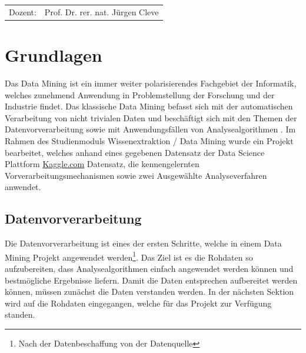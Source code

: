\documentclass[12pt,					%
							 oneside,			%
							 a4paper,			%
							 halfparskip,		%
							 liststotoc,			%
							 bibtotoc,			%
							 fleqn,				%
							 pointlessnumbers]	%
							 {scrreprt}
\newcommand{\Betreuer}{Prof. Dr. rer. nat. Jürgen Cleve}
\newcommand{\blankpage}{
	\newpage
}
\begin{document}
\begin{titlepage}
\begin{center}
\begin{table}[b]
\begin{tabular}{rl}
					Dozent: & \Betreuer \\

				\end{tabular}
			\end{table}
		\end{center}
	\end{titlepage}

	\onehalfspacing 					%
	

	
\newpage

\tableofcontents 					%
	
\chapter{Grundlagen}

Das Data Mining ist ein immer weiter polarisierendes Fachgebiet der Informatik, welches zunehmend Anwendung in Problemstellung der Forschung und der Industrie findet. Das klassische Data Mining befasst sich mit der automatischen Verarbeitung von nicht trivialen Daten und beschäftigt sich mit den Themen der Datenvorverarbeitung sowie mit Anwendungsfällen von Analysealgorithmen \cite{Cleve2020}. Im Rahmen des Studienmoduls \glqq{}Wissenextraktion / Data Mining\grqq{} wurde ein Projekt bearbeitet, welches anhand eines gegebenen Datensatz der Data Science Plattform \href{www.kaggle.com}{Kaggle.com} Datensatz, die kennengelernten Vorverarbeitungsmechanismen sowie zwei Ausgewählte Analyseverfahren anwendet. 

	\section{Datenvorverarbeitung}
	Die Datenvorverarbeitung ist eines der ersten Schritte, welche in einem Data Mining Projekt angewendet werden\footnote{Nach der Datenbeschaffung von der Datenquelle}. Das Ziel ist es die Rohdaten so aufzubereiten, dass Analysealgorithmen einfach angewendet werden können und bestmögliche Ergebnisse liefern.
	Damit die Daten entsprechen aufbereitet werden können, müssen zunächst die Daten verstanden werden. In der nächsten Sektion wird auf die Rohdaten eingegangen, welche für das Projekt zur Verfügung standen.
	\newpage
\end{document}
